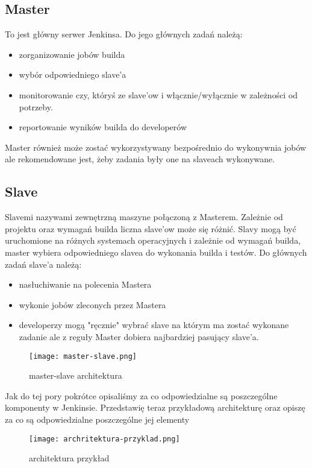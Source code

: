 \subsection{Master}

To jest główny serwer Jenkinsa. Do jego głównych zadań należą:
\begin{itemize}
    \item zorganizowanie jobów builda
    \item wybór odpowiedniego slave'a
    \item monitorowanie czy, któryś ze slave'ow i włącznie/wyłącznie w zależności od potrzeby.
    \item reportowanie wyników builda do developerów
\end{itemize}

Master również może zostać wykorzystywany bezpośrednio do wykonywnia jobów ale rekomendowane jest, żeby zadania były one na slaveach wykonywane.

\subsection{Slave}

Slavemi nazywami zewnętrzną maszyne połączoną z Masterem. Zależnie od projektu oraz wymagań builda liczna slave'ow może się różnić. Slavy mogą być uruchomione na różnych systemach operacyjnych i zależnie od wymagań builda, master wybiera odpowiedniego slavea do wykonania builda i testów. 
Do głównych zadań slave'a należą:
\begin{itemize}
    \item nasłuchiwanie na polecenia Mastera
    \item wykonie jobów zleconych przez Mastera
    \item developerzy mogą "ręcznie" wybrać slave na którym ma zostać wykonane zadanie ale z reguły Master dobiera najbardziej pasujący slave'a.
\end{itemize}

\begin{figure}[htbp]
    \centering
    \texttt{[image: master-slave.png]}
    \caption{master-slave architektura}
    \label{fig:master-slave}
\end{figure}

Jak do tej pory pokrótce opisaliśmy za co odpowiedzialne są poszczególne komponenty w Jenkinsie. Przedstawię teraz przykładową architekturę oraz opiszę za co są odpowiedzialne poszczególne jej elementy 

\begin{figure}[htbp]
    \centering
    \texttt{[image: archritektura-przyklad.png]}
    \caption{architektura przykład}
    \label{fig:jenkins-architektura}
\end{figure}


